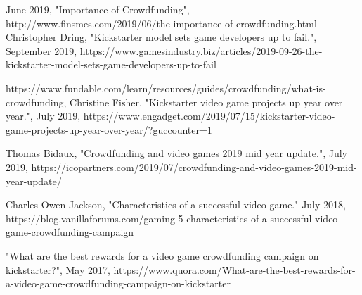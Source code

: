 \documentclass[a4paper]{article}
\begin{document}
\renewcommand{\refname}{\section{References and Further Sources}}
\begin{thebibliography}{1}

June 2019,
"Importance of Crowdfunding",
http://www.finsmes.com/2019/06/the-importance-of-crowdfunding.html
Christopher Dring,
"Kickstarter model sets game developers up to fail.",
September 2019,
https://www.gamesindustry.biz/articles/2019-09-26-the-kickstarter-model-sets-game-developers-up-to-fail

https://www.fundable.com/learn/resources/guides/crowdfunding/what-is-crowdfunding,
Christine Fisher,
"Kickstarter video game projects up year over year.",
July 2019,
https://www.engadget.com/2019/07/15/kickstarter-video-game-projects-up-year-over-year/?guccounter=1

Thomas Bidaux,
"Crowdfunding and video games 2019 mid year update.",
July 2019,
https://icopartners.com/2019/07/crowdfunding-and-video-games-2019-mid-year-update/

Charles Owen-Jackson,
"Characteristics of a successful video game."
July 2018,
https://blog.vanillaforums.com/gaming-5-characteristics-of-a-successful-video-game-crowdfunding-campaign

"What are the best rewards for a video game crowdfunding campaign on kickstarter?",
May 2017,
https://www.quora.com/What-are-the-best-rewards-for-a-video-game-crowdfunding-campaign-on-kickstarter


\end{thebibliography}
\end{document}
